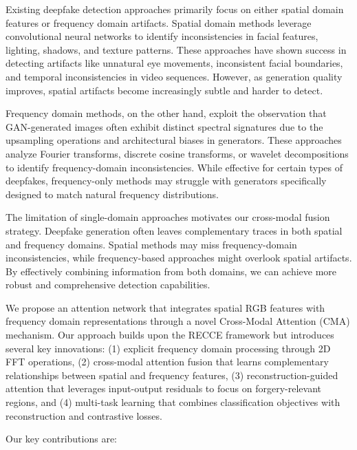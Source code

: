 \documentclass[letterpaper]{article} %
\begin{document}
Existing deepfake detection approaches primarily focus on either spatial domain features or frequency domain artifacts. Spatial domain methods leverage convolutional neural networks to identify inconsistencies in facial features, lighting, shadows, and texture patterns. These approaches have shown success in detecting artifacts like unnatural eye movements, inconsistent facial boundaries, and temporal inconsistencies in video sequences. However, as generation quality improves, spatial artifacts become increasingly subtle and harder to detect.

Frequency domain methods, on the other hand, exploit the observation that GAN-generated images often exhibit distinct spectral signatures due to the upsampling operations and architectural biases in generators. These approaches analyze Fourier transforms, discrete cosine transforms, or wavelet decompositions to identify frequency-domain inconsistencies. While effective for certain types of deepfakes, frequency-only methods may struggle with generators specifically designed to match natural frequency distributions.

The limitation of single-domain approaches motivates our cross-modal fusion strategy. Deepfake generation often leaves complementary traces in both spatial and frequency domains. Spatial methods may miss frequency-domain inconsistencies, while frequency-based approaches might overlook spatial artifacts. By effectively combining information from both domains, we can achieve more robust and comprehensive detection capabilities.

We propose an attention network that integrates spatial RGB features with frequency domain representations through a novel Cross-Modal Attention (CMA) mechanism. Our approach builds upon the RECCE framework but introduces several key innovations: (1) explicit frequency domain processing through 2D FFT operations, (2) cross-modal attention fusion that learns complementary relationships between spatial and frequency features, (3) reconstruction-guided attention that leverages input-output residuals to focus on forgery-relevant regions, and (4) multi-task learning that combines classification objectives with reconstruction and contrastive losses.

Our key contributions are:
\end{document}
